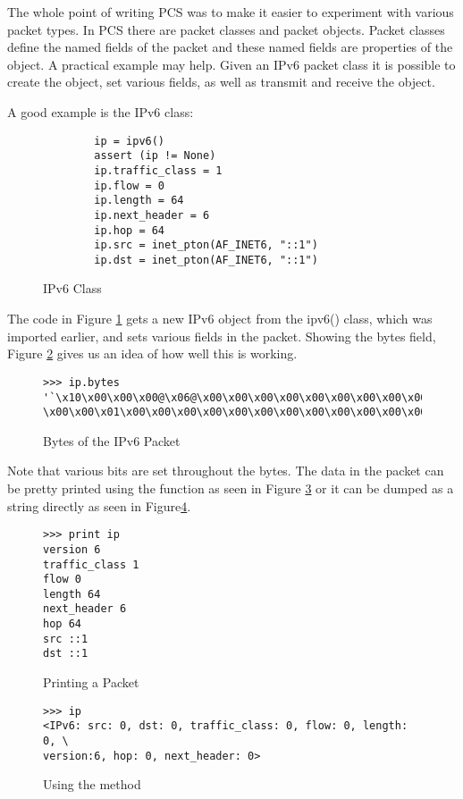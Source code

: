 \documentclass[11pt]{article}
\begin{document}
The whole point of writing PCS was to make it easier to experiment
with various packet types.  In PCS there are packet classes and packet
objects.  Packet classes define the named fields of the packet and
these named fields are properties of the object.  A practical example
may help.  Given an IPv6 packet class it is possible to create the
object, set various fields, as well as transmit and receive the
object.

A good example is the IPv6 class:
\begin{figure}
  \centering
\begin{verbatim}
        ip = ipv6()
        assert (ip != None)
        ip.traffic_class = 1
        ip.flow = 0
        ip.length = 64
        ip.next_header = 6
        ip.hop = 64
        ip.src = inet_pton(AF_INET6, "::1")
        ip.dst = inet_pton(AF_INET6, "::1")
\end{verbatim}
  \caption{IPv6 Class}
  \label{fig:ipv6-class}
\end{figure}
The code in Figure \ref{fig:ipv6-class} gets a new IPv6 object from
the ipv6() class, which was imported earlier, and sets various fields
in the packet.  Showing the bytes field, Figure
\ref{fig:bytes-ipv6-packet} gives us an idea of how well this is
working.

\begin{figure}
  \centering
\begin{verbatim}
>>> ip.bytes
'`\x10\x00\x00\x00@\x06@\x00\x00\x00\x00\x00\x00\x00\x00\x00\x00\x00\x00\x00
\x00\x00\x01\x00\x00\x00\x00\x00\x00\x00\x00\x00\x00\x00\x00\x00\x00\x00\x01'
\end{verbatim}
  \caption{Bytes of the IPv6 Packet}
  \label{fig:bytes-ipv6-packet}
\end{figure}

Note that various bits are set throughout the bytes.  The data in the
packet can be pretty printed using the  function as
seen in Figure \ref{fig:printing-a-packet} or it can be dumped as a
string directly as seen in Figure\ref{fig:repr-method}.

\begin{figure}
  \centering
\begin{verbatim}
>>> print ip
version 6
traffic_class 1
flow 0
length 64
next_header 6
hop 64
src ::1
dst ::1
\end{verbatim}
  \caption{Printing a Packet}
  \label{fig:printing-a-packet}
\end{figure}

  \begin{figure}[h]
    \centering
\begin{verbatim}
>>> ip
<IPv6: src: 0, dst: 0, traffic_class: 0, flow: 0, length: 0, \
version:6, hop: 0, next_header: 0>
\end{verbatim}
    \caption{Using the  method}
    \label{fig:repr-method}
  \end{figure}
\end{document}

